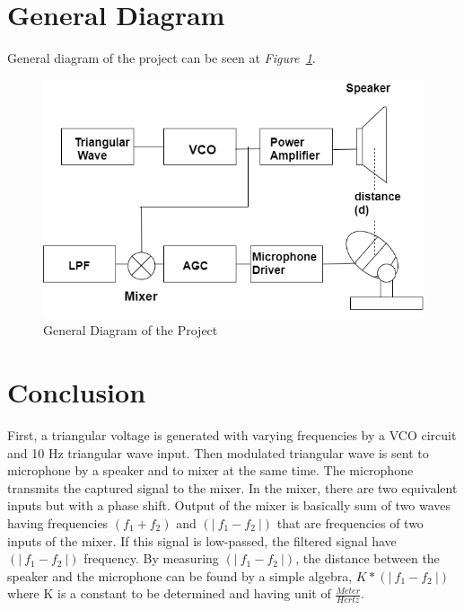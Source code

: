 \documentclass[paper]{IEEEtran}
\begin{document}
		
\section{General Diagram}

	General diagram of the project can be seen at \textit{Figure~\ref{fig:diagram}}.

\begin{figure}[h!]
\setlength{\unitlength}{\textwidth}
\center 
\includegraphics[width=0.5\unitlength]{diagram3.png}
\caption{\label{fig:diagram}General Diagram of the Project }
\end{figure}	

\vfill

\section{Conclusion}

	First, a triangular voltage is generated with varying frequencies by a VCO circuit and 10 Hz triangular wave input. Then modulated triangular wave is sent to microphone by a speaker and to mixer at the same time. The microphone transmits the captured signal to the mixer. In the mixer, there are two equivalent inputs but with a phase shift. Output of the mixer is basically sum of two waves having frequencies $ (f_1+f_2)$ and $(|~f_1 -f_2~|) $ that are frequencies of two inputs of the mixer. If this signal is low-passed, the filtered signal have $(|~f_1 -f_2~|) $ frequency. By measuring $(|~f_1 -f_2~|) $, the distance between the speaker and the microphone can be found by a simple algebra, $K*(|~f_1 -f_2~|) $ where K is a constant to be determined and having unit of $\frac{Meter}{Hertz} $.

 
\end{document}
